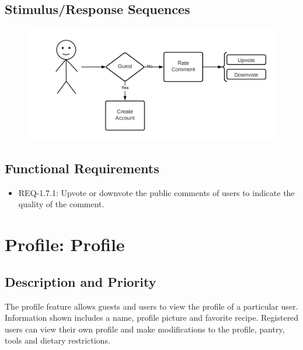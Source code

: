 \documentclass{scrreprt}
\begin{document}
\subsection{Stimulus/Response Sequences}

\begin{figure}[H]\centering
    \includegraphics[width=\columnwidth]{FlowCharts/Recipe-Comment-Rating.png}
\end{figure}

\subsection{Functional Requirements}

\begin{itemize}
    \item REQ-1.7.1: Upvote or downvote the public comments of users to indicate the quality of the comment.
\end{itemize}

\section{Profile: Profile}

\subsection{Description and Priority}

The profile feature allows guests and users to view the profile of a particular user. Information shown includes a name, profile picture and favorite recipe. Registered users can view their own profile and make modifications to the profile, pantry, tools and dietary restrictions.
\end{document}
